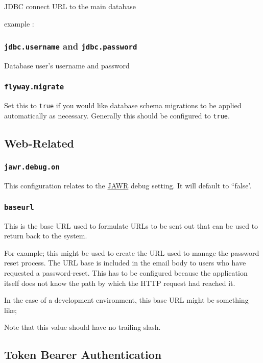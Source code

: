 JDBC connect URL to the main database

example : 

\subsubsection{{\tt jdbc.username} and {\tt jdbc.password}}

Database user's username and password

\subsubsection{\tt flyway.migrate}

Set this to {\tt true} if you would like database schema migrations to be applied automatically as necessary.  Generally this should be configured to {\tt true}.

\subsection{Web-Related}

\subsubsection{\tt jawr.debug.on}

This configuration relates to the \href{https://jawr.java.net/}{JAWR} debug setting.  It will default to ``false'.

\subsubsection{\tt baseurl}

This is the base URL used to formulate URLs to be sent out that can be used to return back to the system.

For example; this might be used to create the URL used to manage the password reset process.  The URL base is included in the email body to users who have requested a password-reset.  This has to be configured because the application itself does not know the path by which the HTTP request had reached it.

In the case of a development environment, this base URL might be something like;


Note that this value should have no trailing slash.

\subsection{Token Bearer Authentication}

